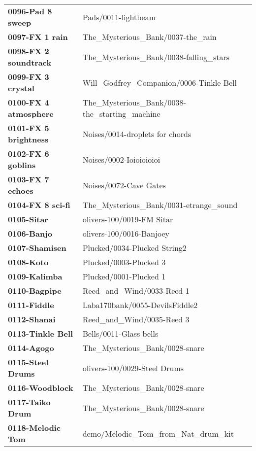 \begin{longtable}{|l l|}
   \textbf{0096-Pad 8 sweep} &
      Pads/0011-lightbeam \\
   \textbf{0097-FX 1 rain} &
      The\_Mysterious\_Bank/0037-the\_rain \\
   \textbf{0098-FX 2 soundtrack} &
      The\_Mysterious\_Bank/0038-falling\_stars \\
   \textbf{0099-FX 3 crystal} &
      Will\_Godfrey\_Companion/0006-Tinkle Bell \\
   \textbf{0100-FX 4 atmosphere} &
      The\_Mysterious\_Bank/0038-the\_starting\_machine \\
   \textbf{0101-FX 5 brightness} &
      Noises/0014-droplets for chords \\
   \textbf{0102-FX 6 goblins} &
      Noises/0002-Ioioioioioi \\
   \textbf{0103-FX 7 echoes} &
      Noises/0072-Cave Gates \\
   \textbf{0104-FX 8 sci-fi} &
      The\_Mysterious\_Bank/0031-etrange\_sound \\
   \textbf{0105-Sitar} &
      olivers-100/0019-FM Sitar \\
   \textbf{0106-Banjo} &
      olivers-100/0016-Banjoey \\
   \textbf{0107-Shamisen} &
      Plucked/0034-Plucked String2 \\
   \textbf{0108-Koto} &
      Plucked/0003-Plucked 3 \\
   \textbf{0109-Kalimba} &
      Plucked/0001-Plucked 1 \\
   \textbf{0110-Bagpipe} &
      Reed\_and\_Wind/0033-Reed 1 \\
   \textbf{0111-Fiddle} &
      Laba170bank/0055-DevilsFiddle2 \\
   \textbf{0112-Shanai} &
      Reed\_and\_Wind/0035-Reed 3 \\
   \textbf{0113-Tinkle Bell} &
      Bells/0011-Glass bells \\
   \textbf{0114-Agogo} &
      The\_Mysterious\_Bank/0028-snare \\
   \textbf{0115-Steel Drums} &
      olivers-100/0029-Steel Drums \\
   \textbf{0116-Woodblock} &
      The\_Mysterious\_Bank/0028-snare \\
   \textbf{0117-Taiko Drum} &
      The\_Mysterious\_Bank/0028-snare \\
   \textbf{0118-Melodic Tom} &
      demo/Melodic\_Tom\_from\_Nat\_drum\_kit \\

\end{longtable}
